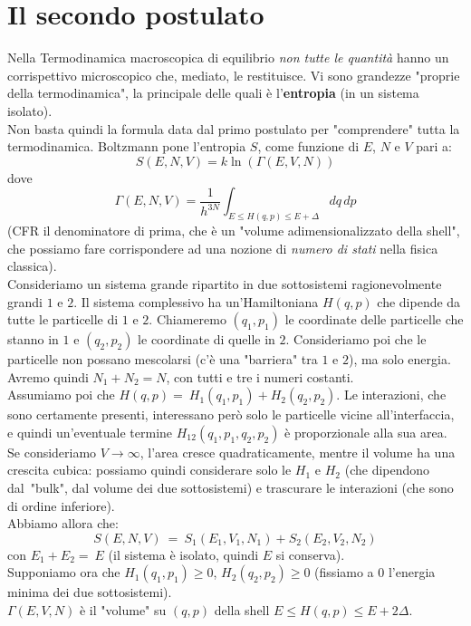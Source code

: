 \documentclass[../MeccanicaStatistica.tex]{subfiles}
\begin{document}
\section{Il secondo postulato}
Nella Termodinamica macroscopica di equilibrio \textit{non tutte le quantità} hanno un corrispettivo microscopico che, mediato, le restituisce. Vi sono grandezze "proprie della termodinamica", la principale delle quali è l'\textbf{entropia} (in un sistema isolato).\\
Non basta quindi la formula data dal primo postulato per "comprendere" tutta la termodinamica. Boltzmann pone l'entropia $S$, come funzione di $E$, $N$ e $V$ pari a:
\[
S(E,N,V) =k \ln \left (\Gamma(E,V,N) \right)
\]
dove
\[
\Gamma(E,N,V) =\frac{1}{h^{3N}}\int_{E\leq H(q,p)\leq E+\Delta} dq\,dp
\]
(CFR il denominatore di prima, che è un "volume adimensionalizzato della shell", che possiamo fare corrispondere ad una nozione di \textit{numero di stati} nella fisica classica).\\ %
Consideriamo un sistema grande ripartito in due sottosistemi ragionevolmente grandi $1$ e $2$. Il sistema complessivo ha un'Hamiltoniana $H(q,p)$ che dipende da tutte le particelle di $1$ e $2$. Chiameremo $(q_1,p_1)$ le coordinate delle particelle che stanno in $1$ e $(q_2, p_2)$ le coordinate di quelle in $2$. Consideriamo poi che le particelle non possano mescolarsi (c'è una "barriera" tra $1$ e $2$), ma solo energia.\\
Avremo quindi $N_1+N_2=N$, con tutti e tre i numeri costanti.\\
Assumiamo poi che $H(q,p) =\ H_1(q_1,p_1) + H_2(q_2,p_2)$. Le interazioni, che sono certamente presenti, interessano però solo le particelle vicine all'interfaccia, e quindi un'eventuale termine $H_{12}(q_1, p_1, q_2, p_2)$ è proporzionale alla sua area. Se consideriamo $V \to \infty$, l'area cresce quadraticamente, mentre il volume ha una crescita cubica: possiamo quindi considerare solo le $H_1$ e $H_2$ (che dipendono dal\ "bulk", dal volume dei due sottosistemi) e trascurare le interazioni (che sono di ordine inferiore).\\
Abbiamo allora che:
\[
S(E,N,V)\ =\ S_1(E_1, V_1, N_1) + S_2(E_2, V_2, N_2)
\]
con $E_1 + E_2 =\ E$ (il sistema è isolato, quindi $E$ si conserva).\\
Supponiamo ora che $H_1(q_1, p_1) \geq 0$, $H_2(q_2, p_2) \geq 0$ (fissiamo a $0$ l'energia minima dei due sottosistemi).\\
$
\Gamma(E,V,N)$ è il "volume" su $(q,p)$ della shell $E\leq H(q,p) \leq E+2\Delta$.
\end{document}

